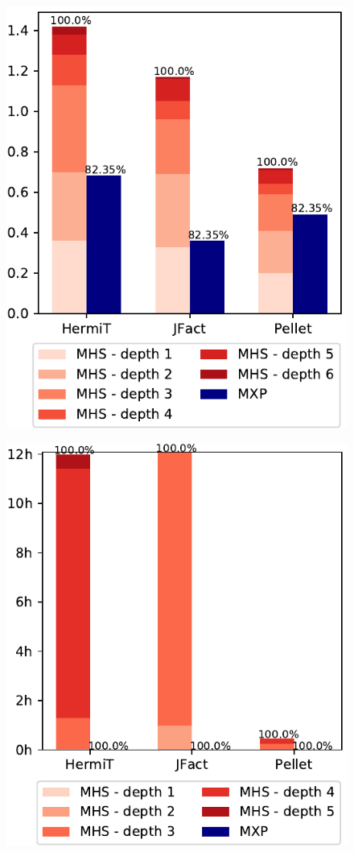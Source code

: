 \documentclass[12pt,a4paper]{article}
\begin{document}
\begin{figure}[H]
	\includegraphics[width=\textwidth]{eval2Family} 	
\end{figure}

\begin{figure}[H]
	\includegraphics[width=\textwidth]{eval2Beer} 
\end{figure}
\end{document}
